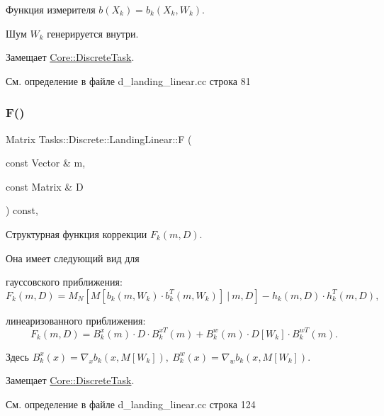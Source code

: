Функция измерителя $b(X_k) = b_k(X_k, W_k)$. 

Шум $W_k$ генерируется внутри. 

Замещает \hyperlink{class_core_1_1_discrete_task_a82c1aa8100dd9211739f8fd9f7d52c81}{Core\+::\+Discrete\+Task}.



См. определение в файле d\+\_\+landing\+\_\+linear.\+cc строка 81

\hypertarget{class_tasks_1_1_discrete_1_1_landing_linear_abb4e2b054240cf909f0128721237334c}{}\label{class_tasks_1_1_discrete_1_1_landing_linear_abb4e2b054240cf909f0128721237334c} 
\subsubsection{\texorpdfstring{F()}{F()}}
{\footnotesize\ttfamily Matrix Tasks\+::\+Discrete\+::\+Landing\+Linear\+::F (\begin{DoxyParamCaption}\item[{const Vector \&}]{m,  }\item[{const Matrix \&}]{D }\end{DoxyParamCaption}) const\hspace{0.3cm}{\ttfamily [override]}, {\ttfamily [virtual]}}



Структурная функция коррекции $F_k(m, D)$. 

Она имеет следующий вид для


\begin{DoxyItemize}
\item гауссовского приближения\+: \[F_k(m, D) = M_N[M[b_k(m, W_k)\cdot b_k^T(m, W_k)] \ |\ m, D] - h_k(m,D) \cdot h_k^T(m, D),\]
\item линеаризованного приближения\+: \[F_k(m, D) = B_k^x(m) \cdot D \cdot B_k^{xT}(m) + B_k^w(m) \cdot D[W_k] \cdot B_k^{wT}(m).\]
\end{DoxyItemize}

Здесь $B_k^x(x) = \nabla_x b_k(x, M[W_k]),\ B_k^w(x) = \nabla_w b_k(x, M[W_k])$. 

Замещает \hyperlink{class_core_1_1_discrete_task_ac55ca2cd47f0c9f7e5d3d3704becee46}{Core\+::\+Discrete\+Task}.



См. определение в файле d\+\_\+landing\+\_\+linear.\+cc строка 124

